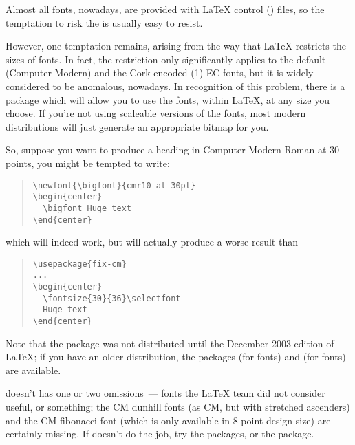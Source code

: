 Almost all fonts, nowadays, are provided with \LaTeX{} control
() files, so the temptation to risk the
 is usually easy to
resist.

However, one temptation remains, arising from the way that \LaTeX{}
restricts the sizes of fonts.  In fact, the restriction only
significantly applies to the default (Computer Modern) and the
Cork-encoded (1) EC fonts, but it is widely considered to be
anomalous, nowadays.  In recognition of this problem, there is a
package  which will allow you to use the fonts, within
\LaTeX{}, at any size you choose.  If you're not using scaleable
versions of the fonts, most modern distributions will just generate an
appropriate bitmap for you.

So, suppose you want to produce a heading in Computer Modern Roman at
30 points, you might be tempted to write:
\begin{quote}
\begin{verbatim}
\newfont{\bigfont}{cmr10 at 30pt}
\begin{center}
  \bigfont Huge text
\end{center}
\end{verbatim}
\end{quote}
which will indeed work, but will actually produce a worse result than
\begin{quote}
\begin{verbatim}
\usepackage{fix-cm}
...
\begin{center}
  \fontsize{30}{36}\selectfont
  Huge text
\end{center}
\end{verbatim}
\end{quote}
Note that the  package was not distributed until the
December 2003 edition of \LaTeX{}; if you have an older distribution,
the packages  (for  fonts) and
 (for  fonts) are available.

 doesn't has one or two omissions~--- fonts the \LaTeX{}
team did not consider useful, or something; the CM dunhill fonts (as
CM, but with stretched ascenders) and the CM fibonacci font (which is only
available in 8-point design size) are certainly missing.  If
 doesn't do the job, try the 
packages, or the  package.

